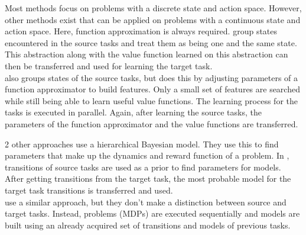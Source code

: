 Most methods focus on problems with a discrete state and action space. However, other methods exist that can be applied on problems with a continuous state and action space. Here, function approximation is always required. \cite{walsh2006transferring} group states encountered in the source tasks and treat them as being one and the same state. This abstraction along with the value function learned on this abstraction can then be transferred and used for learning the target task.\\
\cite{lazaric2008knowledge} also groups states of the source tasks, but does this by adjusting parameters of a function approximator to build features. Only a small set of features are searched while still being able to learn useful value functions. The learning process for the tasks is executed in parallel. Again, after learning the source tasks, the parameters of the function approximator and the value functions are transferred.

2 other approaches use a hierarchical Bayesian model. They use this to find parameters that make up the dynamics and reward function of a problem. In \cite{sunmola2006model}, transitions of source tasks are used as a prior to find parameters for models. After getting transitions from the target task, the most probable model for the target task transitions is transferred and used.\\
\cite{conf/icml/WilsonFRT07} use a similar approach, but they don't make a distinction between source and target tasks. Instead, problems (MDPs) are executed sequentially and models are built using an already acquired set of transitions and models of previous tasks.\\

